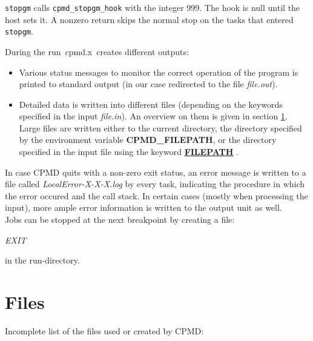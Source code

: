 \documentclass[twoside,10pt,titlepage,a4paper]{article}
\newcommand{\referto}[2]{\hyperlink{#1}{#2}}
\newcommand{\referto}[2]{\htmlref{#2}{#1}}
\newcommand{\refkeyword}[1]{%
\referto{#1}{\textbf{#1}}%
\index{#1}%
}%
\begin{document}
\texttt{stopgm} calls \texttt{cpmd\_stopgm\_hook} with the integer 999.
The hook is null until the host sets it.
A nonzero return skips the normal stop on the tasks that entered
\texttt{stopgm}.

During the run\ cpmd.x\ creates different outputs:
\begin{itemize}
\item Various status messages to monitor the correct operation of the program is
  printed to standard output (in our case redirected to the file {\sl file.out}).

\item
  Detailed data is written into different files (depending on the keywords
  specified in the input {\sl file.in}). An overview on them is given in section
  \ref{FILES}. Large files are written either to the current directory, the directory
  specified by the environment variable {\bf CPMD\_FILEPATH}, or the directory
  specified in the input file using the keyword \refkeyword{FILEPATH}.
\end{itemize}

In case CPMD quits with a non-zero exit status, an error message is written to a file called
\emph{LocalError-X-X-X.log} by every task, indicating the procedure in which the error occured
and the call stack. In certain cases (mostly when processing the input), more ample error information
is written to the output unit as well.
\\

  Jobs can be stopped at the next breakpoint by creating a file:

\medskip

\begin{center}
{\em EXIT}
\end{center}
                
\noindent
in the run-directory.
%
%
%
\clearpage
\section{Files}\label{FILES}
%

Incomplete list of the files used or created by CPMD:\par
\end{document}
